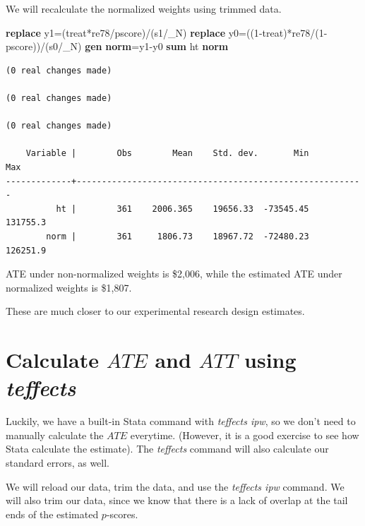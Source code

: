 \documentclass[
]{book}
\newenvironment{Shaded}{\begin{snugshade}}{\end{snugshade}}
\newcommand{\FunctionTok}[1]{\textcolor[rgb]{0.13,0.29,0.53}{\textbf{#1}}}
\newcommand{\KeywordTok}[1]{\textcolor[rgb]{0.13,0.29,0.53}{\textbf{#1}}}
\newcommand{\NormalTok}[1]{#1}
\begin{document}
We will recalculate the normalized weights using trimmed data.

\begin{Shaded}
\begin{Highlighting}[]
\KeywordTok{replace}\NormalTok{ y1=(treat*re78/pscore)/(s1/\_N)}
\KeywordTok{replace}\NormalTok{ y0=((1{-}treat)*re78/(1{-}pscore))/(s0/\_N)}
\KeywordTok{gen} \FunctionTok{norm}\NormalTok{=y1{-}y0}
\KeywordTok{sum}\NormalTok{ ht }\FunctionTok{norm}
\end{Highlighting}
\end{Shaded}

\begin{verbatim}
(0 real changes made)

(0 real changes made)

(0 real changes made)

    Variable |        Obs        Mean    Std. dev.       Min        Max
-------------+---------------------------------------------------------
          ht |        361    2006.365    19656.33  -73545.45   131755.3
        norm |        361     1806.73    18967.72  -72480.23   126251.9
\end{verbatim}

ATE under non-normalized weights is \$2,006, while the estimated ATE under normalized weights is \$1,807.

These are much closer to our experimental research design estimates.

\section{\texorpdfstring{Calculate \(ATE\) and \(ATT\) using \emph{teffects}}{Calculate ATE and ATT using teffects}}\label{calculate-ate-and-att-using-teffects}

Luckily, we have a built-in Stata command with \emph{teffects ipw}, so we don't need to manually calculate the \(ATE\) everytime. (However, it is a good exercise to see how Stata calculate the estimate). The \emph{teffects} command will also calculate our standard errors, as well.

We will reload our data, trim the data, and use the \emph{teffects ipw} command. We will also trim our data, since we know that there is a lack of overlap at the tail ends of the estimated \(p\)-scores.
\end{document}
